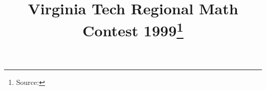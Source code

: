 \documentclass[10pt]{article}
\begin{document}
\title{Virginia Tech Regional Math Contest 1999\footnote{Source: \source}}
\author{\vspace{-2ex}}
\date{\vspace{-6ex}} %
\maketitle






\end{document}
